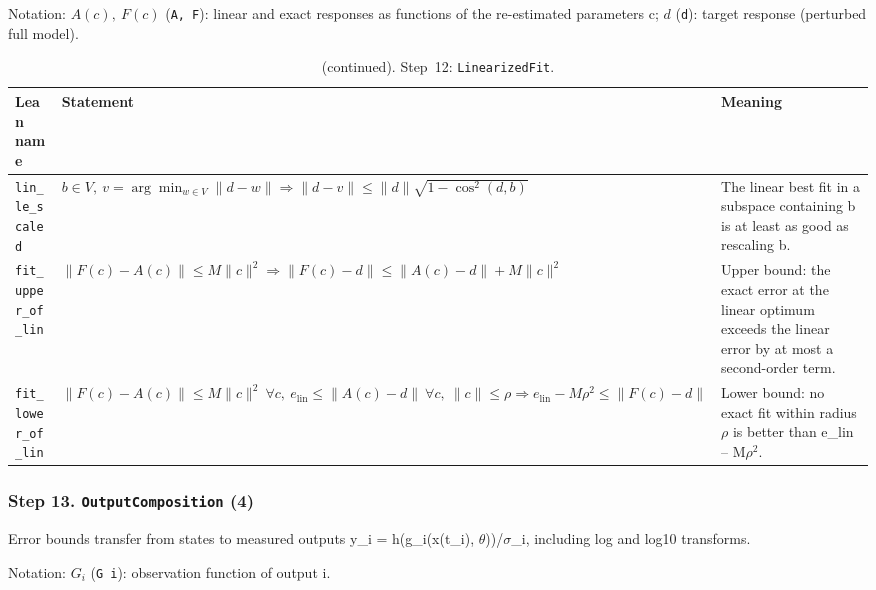 {\small\raggedright Notation: $A(c),\ F(c)$ (\texttt{A, F}): linear and exact responses as functions of the re-estimated parameters c; $d$ (\texttt{d}): target response (perturbed full model).}

\addtocounter{table}{-1}
{\small
\begin{longtable}{@{}>{\raggedright\arraybackslash}p{3.6cm}>{\raggedright\arraybackslash}p{6.6cm}>{\raggedright\arraybackslash}p{5.6cm}@{}}
\caption[]{(continued). Step~12: \texttt{LinearizedFit}.}\\
\toprule
Lean name & Statement & Meaning \\
\midrule
\endhead
\texttt{lin\_\allowbreak{}le\_\allowbreak{}scaled} & $\displaystyle b\in V,\ v=\arg\min_{w\in V}\|d-w\|\Rightarrow\|d-v\|\le\|d\|\sqrt{1-\cos^2(d,b)}$ & The linear best fit in a subspace containing b is at least as good as rescaling b. \\[3pt]
\texttt{fit\_\allowbreak{}upper\_\allowbreak{}of\_\allowbreak{}lin} & $\displaystyle \|F(c)-A(c)\|\le M\|c\|^2\Rightarrow\|F(c)-d\|\le\|A(c)-d\|+M\|c\|^2$ & Upper bound: the exact error at the linear optimum exceeds the linear error by at most a second-order term. \\[3pt]
\texttt{fit\_\allowbreak{}lower\_\allowbreak{}of\_\allowbreak{}lin} & $\displaystyle \|F(c)-A(c)\|\le M\|c\|^2\ \forall c,\ e_{\mathrm{lin}}\le\|A(c)-d\|\ \forall c,\ \|c\|\le\rho\Rightarrow e_{\mathrm{lin}}-M\rho^2\le\|F(c)-d\|$ & Lower bound: no exact fit within radius $\rho$ is better than e\_lin -- M$\rho^2$. \\[3pt]
\bottomrule
\end{longtable}
}

\subsubsection*{Step 13. \texttt{OutputComposition} (4)}
Error bounds transfer from states to measured outputs y\_i = h(g\_i(x(t\_i), $\theta$))/$\sigma$\_i, including log and log10 transforms.

{\small\raggedright Notation: $G_i$ (\texttt{G i}): observation function of output i.}

